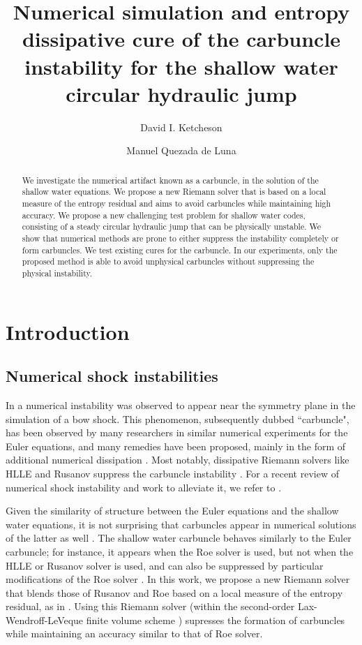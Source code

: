 \documentclass[preprint, 11pt]{article}
\title{Numerical simulation and entropy dissipative cure of the
  carbuncle instability for the shallow water circular hydraulic jump}
\author{
    David I. Ketcheson \and
    Manuel Quezada de Luna
}
\begin{document}
\maketitle

\begin{abstract}
We investigate the numerical artifact known as a carbuncle, in the solution
of the shallow water equations.  We propose a new Riemann solver that is based
on a local measure of the entropy residual and aims to avoid carbuncles while
maintaining high accuracy.
We propose a new challenging test problem for shallow water codes, 
consisting of a steady circular hydraulic
jump that can be physically unstable.  We show that numerical methods are prone to
either suppress the instability completely or form carbuncles.
We test existing cures for the carbuncle. In our experiments, only the proposed
method is able to avoid unphysical carbuncles without suppressing the
physical instability.
\end{abstract}



\section{Introduction}

\subsection{Numerical shock instabilities}

In \cite{peery1988blunt} a numerical instability was observed to
appear near the symmetry plane in the simulation of a bow shock.
This phenomenon, subsequently dubbed ``carbuncle", has been observed by many researchers
in similar numerical experiments for the Euler equations, and many remedies
have been proposed, mainly in the form of additional numerical dissipation
\cite{quirk1997contribution,pandolfi2001numerical,dumbser2004matrix,chauvat2005shock,ismail2009proposed,shen2014stability}.
Most notably, dissipative Riemann solvers like HLLE and Rusanov suppress the carbuncle instability \cite{quirk1997contribution}.
For a recent review of numerical shock instability and work to alleviate it,
we refer to \cite[Section 2.5]{simonnumerical}.

Given the similarity of structure between the Euler equations and the shallow
water equations, it is not surprising that carbuncles appear in numerical
solutions of the latter as well \cite{kemm2014note}.
The shallow water carbuncle behaves similarly to the
Euler carbuncle; for instance, it appears when the Roe solver is used, but not when
the HLLE or Rusanov solver is used, and can also be suppressed by particular modifications
of the Roe solver \cite{kemm2014note,bader2014carbuncle}.
In this work, we propose a new Riemann solver that blends those of Rusanov and Roe
based on a local measure of the entropy residual, 
as in \cite{guermond2011entropy,guermond2018second,guermond2018well}.
Using this Riemann solver (within the second-order Lax-Wendroff-LeVeque 
finite volume scheme \cite{leveque1997wave, leveque2002finite}) supresses the formation of carbuncles 
while maintaining an accuracy similar to that of Roe solver.  
\end{document}
